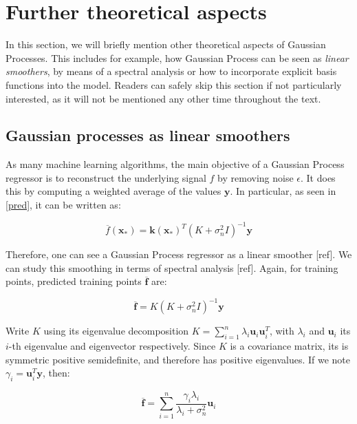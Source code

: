 \documentclass[10pt,a4paper,twoside]{book}
\begin{document}
\section{Further theoretical aspects}

In this section, we will briefly mention other theoretical aspects of Gaussian Processes. This includes for example, how Gaussian Process can be seen as \textit{linear smoothers}, by means of a spectral analysis or how to incorporate explicit basis functions into the model. Readers can safely skip this section if not particularly interested, as it will not be mentioned any other time throughout the text.

\subsection{Gaussian processes as linear smoothers}

As many machine learning algorithms, the main objective of a Gaussian Process regressor is to reconstruct the underlying signal $f$ by removing noise $\epsilon$. It does this by computing a weighted average of the values $\boldsymbol{y}$. In particular, as seen in \ref{pred}, it can be written as:

\begin{equation}
\overline{f}(\boldsymbol{x}_*) = \boldsymbol{k}(\boldsymbol{x}_*)^T(K + \sigma_n^2 I)^{-1}\boldsymbol{y}
\end{equation}

Therefore, one can see a Gaussian Process regressor as a linear smoother [ref]. We can study this smoothing in terms of spectral analysis [ref]. Again, for training points, predicted training points $\overline{\boldsymbol{f}}$ are:

\begin{equation}
\overline{\boldsymbol{f}} = K(K + \sigma_n^2 I)^{-1}\boldsymbol{y}
\end{equation}

Write $K$ using its eigenvalue decomposition $K = \sum_{i=1}^n \lambda_i \boldsymbol{u}_i\boldsymbol{u}_i^T$, with $\lambda_i$ and $\boldsymbol{u}_i$ its $i$-th eigenvalue and eigenvector respectively. Since $K$ is a covariance matrix, its is symmetric positive semidefinite, and therefore has positive eigenvalues. If we note $\gamma_i = \boldsymbol{u}_i^T\boldsymbol{y}$, then:

\begin{equation}
\overline{\boldsymbol{f}} = \sum_{i=1}^n \dfrac{\gamma_i \lambda_i}{\lambda_i + \sigma^2_n}\boldsymbol{u}_i
\end{equation}
\end{document}
